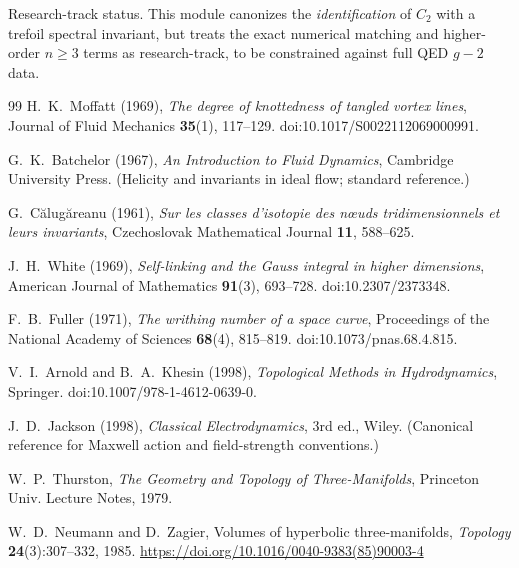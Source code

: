 \documentclass[10pt,reprint,aps,onecolumn,nofootinbib]{revtex4-2}
\begin{document}
    Research-track status. This module canonizes the \emph{identification} of $C_2$ with a trefoil spectral invariant,
    but treats the exact numerical matching and higher-order $n \ge 3$ terms as research-track, to be constrained against
    full QED $g-2$ data.



\begin{thebibliography}{99}
    H.~K.~Moffatt (1969),
    \textit{The degree of knottedness of tangled vortex lines},
    Journal of Fluid Mechanics \textbf{35}(1), 117--129.
    doi:10.1017/S0022112069000991.

    G.~K.~Batchelor (1967),
    \textit{An Introduction to Fluid Dynamics},
    Cambridge University Press.
    (Helicity and invariants in ideal flow; standard reference.)

    G.~C\u{a}lug\u{a}reanu (1961),
    \textit{Sur les classes d'isotopie des n{\oe}uds tridimensionnels et leurs invariants},
    Czechoslovak Mathematical Journal \textbf{11}, 588--625.

    J.~H.~White (1969),
    \textit{Self-linking and the Gauss integral in higher dimensions},
    American Journal of Mathematics \textbf{91}(3), 693--728.
    doi:10.2307/2373348.

    F.~B.~Fuller (1971),
    \textit{The writhing number of a space curve},
    Proceedings of the National Academy of Sciences \textbf{68}(4), 815--819.
    doi:10.1073/pnas.68.4.815.

    V.~I.~Arnold and B.~A.~Khesin (1998),
    \textit{Topological Methods in Hydrodynamics},
    Springer.
    doi:10.1007/978-1-4612-0639-0.

    J.~D.~Jackson (1998),
    \textit{Classical Electrodynamics}, 3rd ed.,
    Wiley.
    (Canonical reference for Maxwell action and field-strength conventions.)

    W.~P.~Thurston,
    \newblock \emph{The Geometry and Topology of Three-Manifolds},
    \newblock Princeton Univ. Lecture Notes, 1979.

    W.~D.~Neumann and D.~Zagier,
    \newblock Volumes of hyperbolic three-manifolds,
    \newblock \emph{Topology} \textbf{24}(3):307--332, 1985. \url{https://doi.org/10.1016/0040-9383(85)90003-4}


\end{thebibliography}
\end{document}
